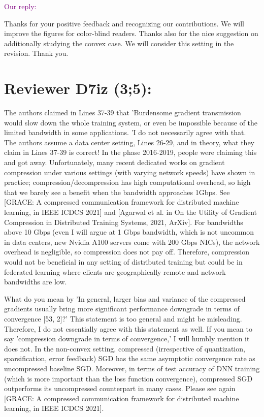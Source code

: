 \documentclass{article}
\begin{document}
\textcolor{purple}{Our reply:}

Thanks for your positive feedback and recognizing our contributions. We will improve the figures for color-blind readers. Thanks also for the nice suggestion on additionally studying the convex case. We will consider this setting in the revision. Thank you.


\section{Reviewer D7iz (3;5):}


The authors claimed in Lines 37-39 that 'Burdensome gradient transmission would slow down the whole training system, or even be impossible because of the limited bandwidth in some applications. 'I do not necessarily agree with that. The authors assume a data center setting, Lines 26-29, and in theory, what they claim in Lines 37-39 is correct! In the phase 2016-2019, people were claiming this and got away. Unfortunately, many recent dedicated works on gradient compression under various settings (with varying network speeds) have shown in practice; compression/decompression has high computational overhead, so high that we barely see a benefit when the bandwidth approaches 1Gbps. See [GRACE: A compressed communication framework for distributed machine learning, in IEEE ICDCS 2021] and [Agarwal et al. in On the Utility of Gradient Compression in Distributed Training Systems, 2021, ArXiv]. For bandwidths above 10 Gbps (even I will argue at 1 Gbps bandwidth, which is not uncommon in data centers, new Nvidia A100 servers come with 200 Gbps NICs), the network overhead is negligible, so compression does not pay off. Therefore, compression would not be beneficial in any setting of distributed training but could be in federated learning where clients are geographically remote and network bandwidths are low.

What do you mean by 'In general, larger bias and variance of the compressed gradients usually bring more significant performance downgrade in terms of convergence [53, 2]?' This statement is too general and might be misleading. Therefore, I do not essentially agree with this statement as well. If you mean to say 'compression downgrade in terms of convergence,' I will humbly mention it does not. In the non-convex setting, compressed (irrespective of quantization, sparsification, error feedback) SGD has the same asymptotic convergence rate as uncompressed baseline SGD. Moreover, in terms of test accuracy of DNN training (which is more important than the loss function convergence), compressed SGD outperforms its uncompressed counterpart in many cases. Please see again [GRACE: A compressed communication framework for distributed machine learning, in IEEE ICDCS 2021].
\end{document}

